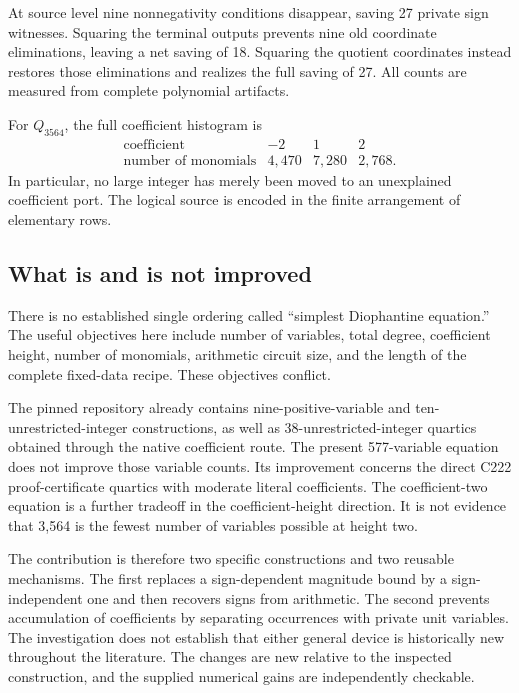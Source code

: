 At source level nine nonnegativity conditions disappear, saving 27 private sign witnesses. Squaring the terminal outputs prevents nine old coordinate eliminations, leaving a net saving of 18. Squaring the quotient coordinates instead restores those eliminations and realizes the full saving of 27. All counts are measured from complete polynomial artifacts.

For \(Q_{3564}\), the full coefficient histogram is
\[
\begin{array}{c|rrr}
\text{coefficient}&-2&1&2\\\hline
\text{number of monomials}&4,470&7,280&2,768.
\end{array}
\]
In particular, no large integer has merely been moved to an unexplained coefficient port. The logical source is encoded in the finite arrangement of elementary rows.

\subsection{What is and is not improved}

There is no established single ordering called ``simplest Diophantine equation.'' The useful objectives here include number of variables, total degree, coefficient height, number of monomials, arithmetic circuit size, and the length of the complete fixed-data recipe. These objectives conflict.

The pinned repository already contains nine-positive-variable and ten-unrestricted-integer constructions, as well as 38-unrestricted-integer quartics obtained through the native coefficient route. The present 577-variable equation does not improve those variable counts. Its improvement concerns the direct C222 proof-certificate quartics with moderate literal coefficients. The coefficient-two equation is a further tradeoff in the coefficient-height direction. It is not evidence that 3,564 is the fewest number of variables possible at height two.

The contribution is therefore two specific constructions and two reusable mechanisms. The first replaces a sign-dependent magnitude bound by a sign-independent one and then recovers signs from arithmetic. The second prevents accumulation of coefficients by separating occurrences with private unit variables. The investigation does not establish that either general device is historically new throughout the literature. The changes are new relative to the inspected construction, and the supplied numerical gains are independently checkable.

